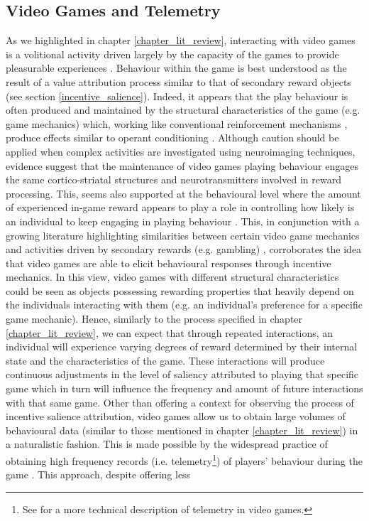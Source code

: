 \subsection{Video Games and Telemetry}
\label{videogame_telemetries}
As we highlighted in chapter \ref{chapter_lit_review}, interacting with video games is a volitional activity driven largely by the capacity of the games to provide pleasurable experiences \cite{boyle2012engagement}. Behaviour within the game is best understood as the result of a value attribution process similar to that of secondary reward objects (see section \ref{incentive_salience}). Indeed, it appears that the play behaviour is often produced and maintained by the structural characteristics of the game (e.g. game mechanics) \cite{king2010video} which, working like conventional reinforcement mechanisms \cite{chumbley2006affect,wang2011game,phillips2013videogame,avserivskis2017computational}, produce effects similar to operant conditioning \cite{skinner1965science}. Although caution should be applied when complex activities are investigated using neuroimaging techniques, evidence suggest that the maintenance of video games playing behaviour engages the same cortico-striatal structures \cite{hoeft2008gender,mathiak2011reward,cole2012interactivity,klasen2012neural,lorenz2015video,gleich2017functional} and neurotransmitters \cite{koepp1998evidence} involved in reward processing. This, seems also supported at the behavioural level where the amount of experienced in-game reward appears to play a role in controlling how likely is an individual to keep engaging in playing behaviour \cite{agarwal2017quitting, steyvers2019joint}. This, in conjunction with a growing literature highlighting similarities between certain video game mechanics and activities driven by secondary rewards (e.g. gambling) \cite{king2010role,drummond2018video,zendle2018video}, corroborates the idea that video games are able to elicit behavioural responses through incentive mechanics. In this view, video games with different structural characteristics could be seen as objects possessing rewarding properties that heavily depend on the individuals interacting with them (e.g. an individual's preference for a specific game mechanic). Hence, similarly to the process specified in chapter \ref{chapter_lit_review}, we can expect that through repeated interactions, an individual will experience varying degrees of reward determined by their internal state and the characteristics of the game. These interactions will produce continuous adjustments in the level of saliency attributed to playing that specific game which in turn will influence the frequency and amount of future interactions with that same game. Other than offering a context for observing the process of incentive salience attribution, video games allow us to obtain large volumes of behavioural data (similar to those mentioned in chapter \ref{chapter_lit_review}) in a naturalistic fashion. This is made possible by the widespread practice of obtaining high frequency records (i.e. telemetry\footnote{See \cite{el2016game} for a more technical description of telemetry in video games.}) of players' behaviour during the game \cite{drachen2015behavioral}. This approach, despite offering less 
